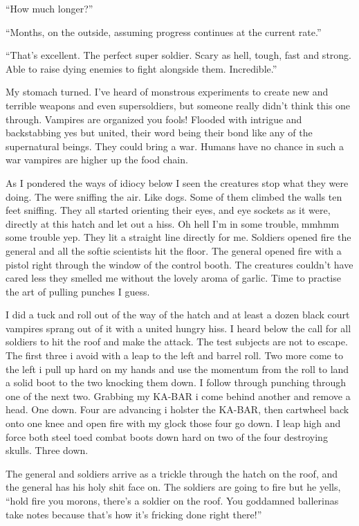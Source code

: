 ``How much longer?''

``Months, on the outside, assuming progress continues at the current rate.''

``That's excellent. The perfect super soldier. Scary as hell, tough, fast and strong. Able to raise dying enemies to fight alongside them. Incredible.''

My stomach turned. I've heard of monstrous experiments to create new and terrible weapons and even supersoldiers, but someone really didn't think this one through. Vampires are organized you fools! Flooded with intrigue and backstabbing yes but united, their word being their bond like any of the supernatural beings. They could bring a war. Humans have no chance in such a war vampires are higher up the food chain.

As I pondered the ways of idiocy below I seen the creatures stop what they were doing. The were sniffing the air. Like dogs. Some of them climbed the walls ten feet sniffing. They all started orienting their eyes, and eye sockets as it were, directly at this hatch and let out a hiss. Oh hell I'm in some trouble, mmhmm some trouble yep. They lit a straight line directly for me. Soldiers opened fire the general and all the softie scientists hit the floor. The general opened fire with a pistol right through the window of the control booth. The creatures couldn't have cared less they smelled me without the lovely aroma of garlic. Time to practise the art of pulling punches I guess.

I did a tuck and roll out of the way of the hatch and at least a dozen black court vampires sprang out of it with a united hungry hiss. I heard below the call for all soldiers to hit the roof and make the attack. The test subjects are not to escape. The first three i avoid with a leap to the left and barrel roll. Two more come to the left i pull up hard on my hands and use the momentum from the roll to land a solid boot to the two knocking them down. I follow through punching through one of the next two. Grabbing my KA-BAR i come behind another and remove a head. One down. Four are advancing i holster the KA-BAR, then cartwheel back onto one knee and open fire with my glock those four go down. I leap high and force both steel toed combat boots down hard on two of the four destroying skulls. Three down.

The general and soldiers arrive as a trickle through the hatch on the roof, and the general has his holy shit face on. The soldiers are going to fire but he yells, ``hold fire you morons, there's a soldier on the roof. You goddamned ballerinas take notes because that's how it's fricking done right there!''

